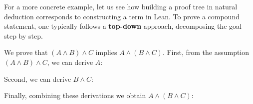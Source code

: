 \noindent
For a more concrete example, let us see how building a proof tree in
natural deduction corresponds to constructing a term in Lean.
To prove a compound statement, one typically follows a
\textbf{top-down} approach, decomposing the goal step by step.

\begin{example}
  We prove that $(A \land B) \land C$ implies $A \land (B \land C)$.
  First, from the assumption $(A \land B) \land C$, we can derive $A$:
  \begin{prooftree}
  \end{prooftree}
  Second, we can derive $B \land C$:
  \begin{prooftree}
  \end{prooftree}
  Finally, combining these derivations we obtain $A \land (B \land C)$:
  \begin{prooftree}
  \end{prooftree}
\end{example}

